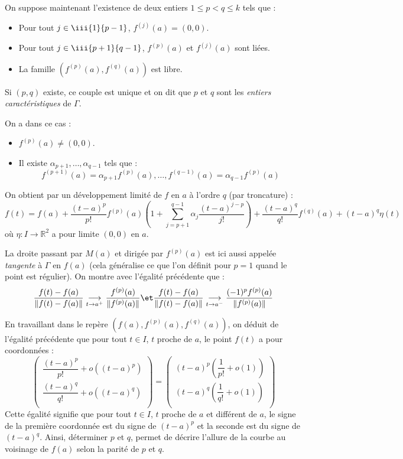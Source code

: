 \documentclass[french,11pt,twoside]{VcCours}
\begin{document}
\medskip

On suppose maintenant l'existence de deux entiers $1 \leq p <q \leq k$ tels que :
\begin{itemize}
\item Pour tout $j \in \iii{1}{p-1}$, $f^{(j)}(a)=(0,0)$.
\item Pour tout $j \in \iii{p+1}{q-1}$, $f^{(p)}(a)$ et $f^{(j)}(a)$ sont liées.
\item La famille $(f^{(p)}(a), f^{(q)}(a))$ est libre.
\end{itemize}

\medskip

Si $(p,q)$ existe, ce couple est unique et on dit que $p$ et $q$ sont les \emph{entiers caractéristiques} de $\Gamma$. 

\medskip

On a dans ce cas :

\begin{itemize}
\item $f^{(p)}(a) \neq (0,0)$.
\item Il existe $\alpha_{p+1}, \ldots, \alpha_{q-1}$ tels que :
$$ f^{(p+1)}(a) = \alpha_{p+1} f^{(p)}(a), \ldots,  f^{(q-1)}(a)= \alpha_{q-1} f^{(p)}(a)$$
\end{itemize}
On obtient par un développement limité de $f$ en $a$ à l'ordre $q$ (par troncature) : 
$$ f(t) =  f(a) + \dfrac{(t-a)^p}{p!} f^{(p)}(a) \left( 1 + \sum_{j=p+1}^{q-1} \alpha_j \dfrac{(t-a)^{j-p}}{j!} \right) + \dfrac{(t-a)^q}{q!} f^{(q)}(a) + (t-a)^q \eta(t)$$
où $\eta : I \rightarrow \mathbb{R}^2$ a pour limite $(0,0)$ en $a$.

\begin{Remarque}{} La droite passant par $M(a)$ et dirigée par $f^{(p)}(a)$ est ici aussi appelée \emph{tangente} à $\Gamma$ en $f(a)$ (cela généralise ce que l'on définit pour $p=1$ quand le point est régulier). On montre avec l'égalité précédente que :
$$ \dfrac{f(t)-f(a)}{\Vert f(t)-f(a) \Vert} \underset{t \rightarrow a^+}{\longrightarrow} \frac{f^{(p)}(a)}{\Vert f^{(p)}(a) \Vert} \et  \dfrac{f(t)-f(a)}{\Vert f(t)-f(a) \Vert} \underset{t \rightarrow a^-}{\longrightarrow} \frac{(-1)^p f^{(p)}(a)}{\Vert f^{(p)}(a) \Vert}$$
\end{Remarque}
En travaillant dans le repère $(f(a), f^{(p)}(a), f^{(q)}(a))$, on déduit de l'égalité précédente que pour tout $t \in I$, $t$ proche de $a$, le point $f(t)$ a pour coordonnées :
$$ \begin{pmatrix}
\dfrac{(t-a)^p}{p!}+o((t-a)^p) \\
\dfrac{(t-a)^q}{q!}+o((t-a)^q) \\
\end{pmatrix} = \begin{pmatrix}
(t-a)^p \left( \dfrac{1}{p!} + o(1) \right) \\
(t-a)^q \left( \dfrac{1}{q!} + o(1) \right) \\
\end{pmatrix}$$
Cette égalité signifie que pour tout $t \in I$, $t$ proche de $a$ et différent de $a$, le signe de la première coordonnée est du signe de $(t-a)^p$ et la seconde est du signe de $(t-a)^q$. Ainsi, déterminer $p$ et $q$, permet de décrire l'allure de la courbe au voisinage de $f(a)$ selon la parité de $p$ et $q$.
\end{document}
